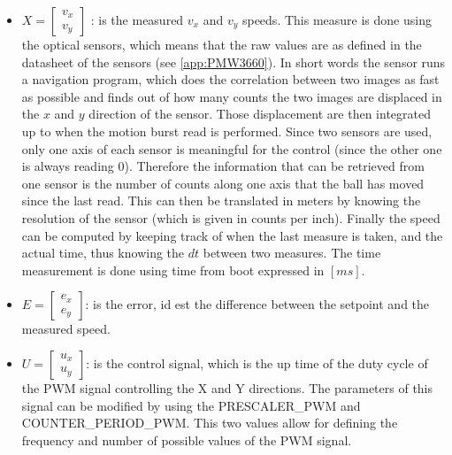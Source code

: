 \documentclass[12pt,a4paper, twoside]{article}
\begin{document}
\begin{itemize}
	\item 
	$X = \begin{bmatrix}
	v_x\\
	v_y
	\end{bmatrix}$
	: is the measured $v_x$ and $v_y$ speeds. This measure is done using the optical sensors, which means that the raw values are as defined in the datasheet of the sensors (see \ref{app:PMW3660}). In short words the sensor runs a navigation program, which does the correlation between two images as fast as possible and finds out of how many counts the two images are displaced in the $x$ and $y$ direction of the sensor. Those displacement are then integrated up to when the motion burst read is performed. Since two sensors are used, only one axis of each sensor is meaningful for the control (since the other one is always reading 0). Therefore the information that can be retrieved from one sensor is the number of counts along one axis that the ball has moved since the last read. This can then be translated in meters by knowing the resolution of the sensor (which is given in counts per inch). Finally the speed can be computed by keeping track of when the last measure is taken, and the actual time, thus knowing the $dt$ between two measures. The time measurement is done using time from boot expressed in $[ms]$.
	\item	
	$E = \begin{bmatrix}
	e_x\\
	e_y
	\end{bmatrix}$: is the error, id est the difference between the setpoint and the measured speed.
	\item  
	$U = 
	\begin{bmatrix}
		u_x\\
		u_y
	\end{bmatrix}$: is the control signal, which is the up time of the duty cycle of the PWM signal controlling the X and Y directions. The parameters of this signal can be modified by using the PRESCALER\_PWM and COUNTER\_PERIOD\_PWM. This two values allow for defining the frequency and number of possible values of the PWM signal.
\end{itemize}
\end{document}
